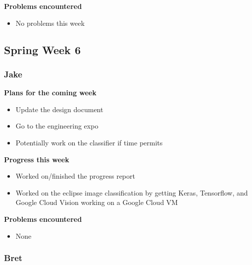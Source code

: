 \documentclass[10pt, onecolumn, draftclsnofoot, letterpaper, compsoc]{IEEEtran}
\begin{document}
    \noindent \textbf{Problems encountered}

    \begin{itemize}

    \item No problems this week

    \end{itemize}

\subsection{Spring Week 6}

    \subsubsection{Jake}

    \noindent \textbf{Plans for the coming week}

    \begin{itemize}

    \item Update the design document
    \item Go to the engineering expo
    \item Potentially work on the classifier if time permits

    \end{itemize}

    \noindent \textbf{Progress this week}

    \begin{itemize}

    \item Worked on/finished the progress report
    \item Worked on the eclipse image classification by getting Keras, Tensorflow, and Google Cloud Vision working on a Google Cloud VM

    \end{itemize}

    \noindent \textbf{Problems encountered}

    \begin{itemize}

    \item None

    \end{itemize}

    \subsubsection{Bret}
\end{document}
